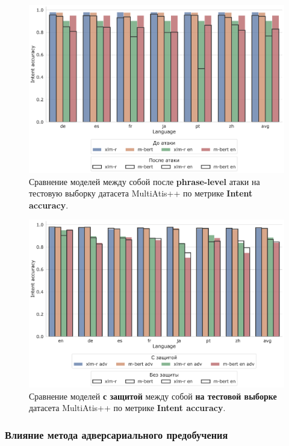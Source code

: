 \begin{figure}[H]
    \centering
    \includegraphics[width=\textwidth]{images/6}
    \caption{Сравнение моделей между собой после \textbf{phrase-level} атаки на тестовую выборку датасета MultiAtis++ по метрике \textbf{Intent accuracy}.}\label{fig:figure6}
\end{figure}

\begin{figure}[H]
    \centering
    \includegraphics[width=\textwidth]{images/9}
    \caption{Сравнение моделей \textbf{с защитой} между собой \textbf{на тестовой выборке} датасета MultiAtis++ по метрике \textbf{Intent accuracy}.}\label{fig:figure9}
\end{figure}

\subsubsection{Влияние метода адверсариального предобучения}

